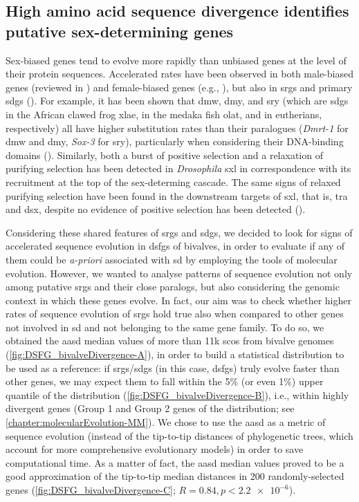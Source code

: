 \subsection{High amino acid sequence divergence identifies putative sex-determining genes}
Sex-biased genes tend to evolve more rapidly than unbiased genes at the level of their protein sequences. Accelerated rates have been observed in both male-biased genes (reviewed in ) and female-biased genes (e.g., ), but also in \glspl{srg} and primary \glspl{sdg} (). For example, it has been shown that \gls{dmw}, \gls{dmy}, and \gls{sry} (which are \glspl{sdg} in the African clawed frog \gls{xlae}, in the medaka fish \gls{olat}, and in eutherians, respectively) all have higher substitution rates than their paralogues (\textit{Dmrt-1} for \gls{dmw} and \gls{dmy}, \textit{Sox-3} for \gls{sry}), particularly when considering their DNA-binding domains (). Similarly, both a burst of positive selection and a relaxation of purifying selection has been detected in \textit{Drosophila} \gls{sxl} in correspondence with its recruitment at the top of the sex-determing cascade. The same signs of relaxed purifying selection have been found in the downstream targets of \gls{sxl}, that is, \gls{tra} and \gls{dsx}, despite no evidence of positive selection has been detected ().

Considering these shared features of \glspl{srg} and \glspl{sdg}, we decided to look for signs of accelerated sequence evolution in \glspl{dsfg} of bivalves, in order to evaluate if any of them could be \textit{a-priori} associated with \gls{sd} by employing the tools of molecular evolution. However, we wanted to analyse patterns of sequence evolution not only among putative \glspl{srg} and their close paralogs, but also considering the genomic context in which these genes evolve. In fact, our aim was to check whether higher rates of sequence evolution of \glspl{srg} hold true also when compared to other genes not involved in \gls{sd} and not belonging to the same gene family. To do so, we obtained the \gls{aasd} median values of more than 11k \glspl{sco} from bivalve genomes (\cref{fig:DSFG_bivalveDivergence-A}), in order to build a statistical distribution to be used as a reference: if \glspl{srg}/\glspl{sdg} (in this case, \glspl{dsfg}) truly evolve faster than other genes, we may expect them to fall within the 5\% (or even 1\%) upper quantile of the distribution (\cref{fig:DSFG_bivalveDivergence-B}), i.e., within highly divergent genes (Group 1 and Group 2 genes of the distribution; see \cref{chapter:molecularEvolution-MM}). We chose to use the \gls{aasd} as a metric of sequence evolution (instead of the tip-to-tip distances of phylogenetic trees, which account for more comprehensive evolutionary models) in order to save computational time. As a matter of fact, the \gls{aasd} median values proved to be a good approximation of the tip-to-tip median distances in 200 randomly-selected genes (\cref{fig:DSFG_bivalveDivergence-C}; $R = 0.84, p < \num{2.2e-6}$).

